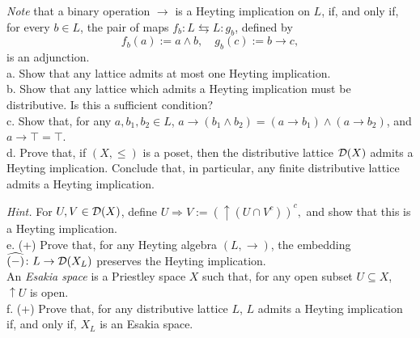 {\it {Note}} that a binary operation $\to$ is a Heyting implication on $L$, if, and only if, for every $b \in L$, the pair of maps $f_b \colon L \leftrightarrows L \colon g_b$, defined by 
\[ f_b(a) := a \wedge b, \quad g_b(c) := b \to c,\]
is an adjunction.\\ %

a. Show that any lattice admits at most one Heyting implication.\\

b. Show that any lattice which admits a Heyting implication must be distributive. Is this a sufficient condition?\\

c. Show that, for any $a, b_1, b_2 \in L$, $a \to (b_1 \wedge b_2) = (a \to b_1) \wedge (a \to b_2)$, and $a \to \top = \top$.\\


d. Prove that, if $(X, \leq)$ is a poset, then the distributive lattice $\mathcal{D}(X)$ admits a Heyting implication. Conclude that, in particular, any finite distributive lattice admits a Heyting implication.

{\it Hint.} For $U, V \in \mathcal{D}(X)$, define $U \Rightarrow V := ({\uparrow}(U \cap V^c))^c,$
  and show that this is a Heyting implication. \\

e. (+) Prove that, for any Heyting algebra $(L,\to)$, the embedding $\widehat{(-)} \colon L \to \mathcal{D}(X_L)$ preserves the Heyting implication.\\


An \emph{Esakia space} is a Priestley space $X$ such that, for any open subset $U \subseteq X$, ${\uparrow} U$ is open. \\

f. (+) Prove that, for any distributive lattice $L$, $L$ admits a Heyting implication if, and only if, $X_L$ is an Esakia space.\\




